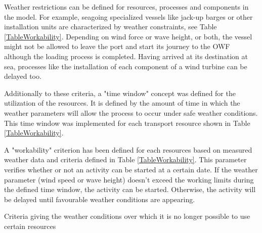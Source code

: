Weather restrictions can be defined for resources, processes and components in the model. For example, seagoing specialized vessels like jack-up barges or other installation units are characterized by weather constraints, see Table \ref{TableWorkability}. Depending on wind force or wave height, or both, the vessel might not be allowed to leave the port and start its journey to the OWF although the loading process is completed. Having arrived at its destination at sea, processes like the installation of each component of a wind turbine can be delayed too.

Additionally to these criteria, a "time window" concept was defined for the utilization of the resources. It is defined by the amount of time in which the weather parameters will allow the process to occur under safe weather conditions. This time window was implemented for each transport resource shown in Table \ref{TableWorkability}.

A "workability" criterion has been defined for each resources based on measured weather data and criteria defined in Table \ref{TableWorkability}. This parameter verifies whether or not an activity can be started at a certain date. If the weather parameter (wind speed or wave height) doesn't exceed the working limits during the defined time window, the activity can be started. Otherwise, the activity will be delayed until favourable weather conditions are appearing.

\begin{table}[!hbp]
\caption{Criteria giving the weather conditions over which it is no longer possible to use certain resources}
\begin{center}

\end{center}
\label{TableWorkability}
\end{table}

